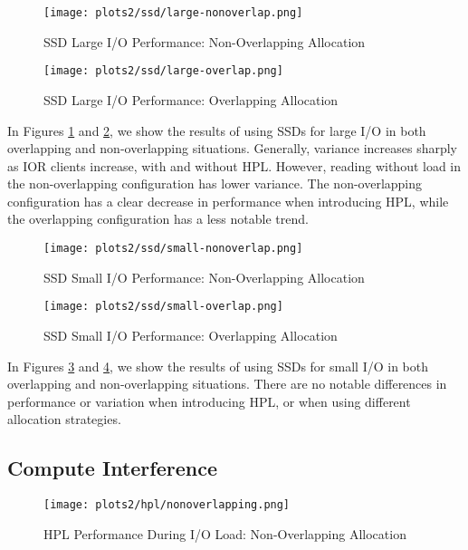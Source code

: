 \documentclass[conference]{IEEEtran}
\begin{document}
\begin{figure}[!htb]
  \centerline{\texttt{[image: plots2/ssd/large-nonoverlap.png]}}
  \caption{SSD Large I/O Performance: Non-Overlapping Allocation}
  \label{fig:ssd-large-non}
\end{figure}

\begin{figure}[!htb]
  \centerline{\texttt{[image: plots2/ssd/large-overlap.png]}}
  \caption{SSD Large I/O Performance: Overlapping Allocation}
  \label{fig:ssd-large-over}
\end{figure}

In Figures \ref{fig:ssd-large-non} and \ref{fig:ssd-large-over}, we
show the results of using SSDs for large I/O in both overlapping and
non-overlapping situations. Generally, variance increases sharply as
IOR clients increase, with and without HPL. However, reading without
load in the non-overlapping configuration has lower variance. The
non-overlapping configuration has a clear decrease in performance when
introducing HPL, while the overlapping configuration has a less
notable trend.

\begin{figure}[!htb]
  \centerline{\texttt{[image: plots2/ssd/small-nonoverlap.png]}}
  \caption{SSD Small I/O Performance: Non-Overlapping Allocation}
  \label{fig:ssd-small-non}
\end{figure}

\begin{figure}[!htb]
  \centerline{\texttt{[image: plots2/ssd/small-overlap.png]}}
  \caption{SSD Small I/O Performance: Overlapping Allocation}
  \label{fig:ssd-small-over}
\end{figure}

In Figures \ref{fig:ssd-small-non} and \ref{fig:ssd-small-over}, we
show the results of using SSDs for small I/O in both overlapping and
non-overlapping situations. There are no notable differences in
performance or variation when introducing HPL, or when using different
allocation strategies.

\subsection{Compute Interference}
\begin{figure}[!htb]
  \centerline{\texttt{[image: plots2/hpl/nonoverlapping.png]}}
  \caption{HPL Performance During I/O Load: Non-Overlapping Allocation}
  \label{fig:hpl-non}
\end{figure}
\end{document}
